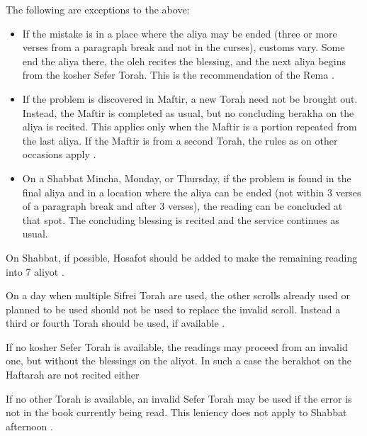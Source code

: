\documentclass[11pt, openany]{article}
\begin{document}
The following are exceptions to the above:

\begin{itemize}
	\item If the mistake is in a place where the aliya may be ended (three or more verses from a paragraph break and not in the curses), customs vary. Some end the aliya there, the oleh recites the blessing, and the next aliya begins from the kosher Sefer Torah.  This is the recommendation of the Rema \parencite*[22:2 citing OC 146]{PH}.
	\item If the problem is discovered in Maftir, a new Torah need not be brought out.  Instead, the Maftir is completed as usual, but no concluding berakha on the aliya is recited.  This applies only when the Maftir is a portion repeated from the last aliya.  If the Maftir is from a second Torah, the rules as on other occasions apply \parencite*[78:8]{Kitzur}.
	\item On a Shabbat Mincha, Monday, or Thursday, if the problem is found in the final aliya and in a location where the aliya can be ended (not within 3 verses of a paragraph break and after 3 verses), the reading can be concluded at that spot.  The concluding blessing is recited and the service continues as usual.
\end{itemize}

On Shabbat, if possible, Hosafot should be added to make the remaining reading into 7 aliyot \parencite*[24:7]{Kitzur}.

On a day when multiple Sifrei Torah are used, the other scrolls already used or planned to be used should not be used to replace the invalid scroll.  Instead a third or fourth Torah should be used, if available \parencite*[78:10]{Kitzur}.

If no kosher Sefer Torah is available, the readings may proceed from an invalid one, but without the blessings on the aliyot.  In such a case the berakhot on the Haftarah are not recited either \parencite*[79:10]{Kitzur}

If no other Torah is available, an invalid Sefer Torah may be used if the error is not in the book currently being read.  This leniency does not apply to Shabbat afternoon \parencite*[24:10]{Kitzur}.
	
\end{document}
